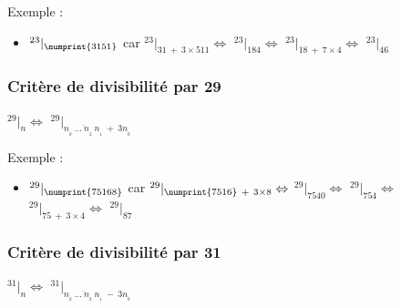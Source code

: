\documentclass[a4paper]{article}
\begin{document}
{ \parindent=0.5cm Exemple : }

\begin{Large}
\begin{itemize}

	\item[] $ ^{23}|_{\numprint{3151}}$ {\normalsize car} $^{23}|_{31~+~3\times511} \Leftrightarrow$ $^{23}|_{184} \Leftrightarrow$ $^{23}|_{18~+~7\times4} \Leftrightarrow$ $^{23}|_{46}$\\

\end{itemize}
\end{Large}


\vfill
{\noindent \dotfill}


\subsubsection*{Critère de divisibilité par 29}

\begin{center}
	\huge
	$ ^{29}|_n \Leftrightarrow$ $^{29}|_{\overline{n_{_{k}}~\dots~n_{_2}~n_{_1}}~+~3n_{_0}} $
\end{center}

{ \parindent=0.5cm Exemple : }

\begin{Large}
\begin{itemize}

	\item[] $ ^{29}|_{\numprint{75168}}$ {\normalsize car} $^{29}|_{\numprint{7516}~+~3\times8} \Leftrightarrow$ $^{29}|_{7540} \Leftrightarrow$ $^{29}|_{754} \Leftrightarrow$ $^{29}|_{75~+~3\times4} \Leftrightarrow$ $^{29}|_{87}$\\

\end{itemize}
\end{Large}

\vfill

\pagebreak


\subsubsection*{Critère de divisibilité par 31}

\begin{center}
	\huge
	$ ^{31}|_n \Leftrightarrow$ $^{31}|_{\overline{n_{_{k}}~\dots~n_{_2}~n_{_1}}~-~3n_{_0}} $\\
\end{center}
\end{document}
